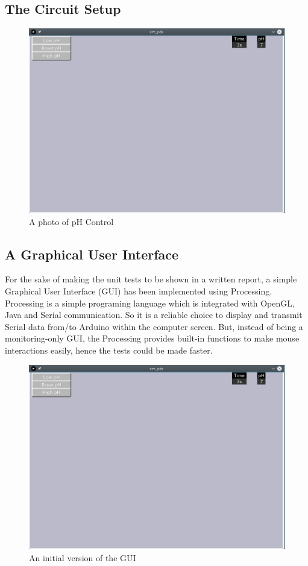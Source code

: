 
\subsection{The Circuit Setup}

\begin{figure}[h]
    \centering
    \includegraphics[width=.7\textwidth]{img/gui1.png}
    \caption{A photo of pH Control}
    \label{fig:photo}
\end{figure}

\subsection{A Graphical User Interface}

For the sake of making the unit tests to be shown in a written report,
a simple Graphical User Interface (GUI) has been implemented using Processing.
Processing is a simple programing language which is integrated with OpenGL,
Java and Serial communication.
So it is a reliable choice to display and transmit Serial data from/to Arduino within the computer screen.
But,
instead of being a monitoring-only GUI,
the Processing provides built-in functions to make mouse interactions easily,
hence the tests could be made faster.

\begin{figure}[h]
    \centering
    \includegraphics[width=.7\textwidth]{img/gui1.png}
    \caption{An initial version of the GUI}
    \label{fig:gui}
\end{figure}
